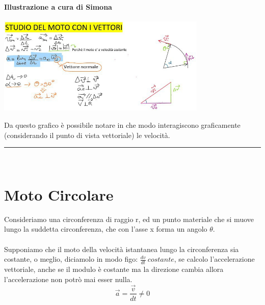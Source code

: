 \documentclass[12pt, a4paper, openany, oneside]{book}
\begin{document}
\paragraph{Illustrazione a cura di Simona}
\begin{center}
\includegraphics[width=0.75\textwidth]{mruvettoriale}
\end{center}
Da questo grafico è possibile notare in che modo interagiscono graficamente 
(considerando il punto di vista vettoriale) le velocità. 
\\
{\color{black} \rule{\linewidth}{0.3mm} }
\\
\section{Moto Circolare}
Consideriamo una circonferenza di raggio r, ed un punto materiale che si muove
lungo la suddetta circonferenza, che con l'asse x forma un angolo $\theta$. \\
\\
Supponiamo che il moto della velocità istantanea lungo la circonferenza sia 
costante, o meglio, diciamolo in modo figo: $\frac{dv}{dt} ~ costante$, se calcolo
l'accelerazione vettoriale, anche se il modulo è costante ma la direzione cambia
allora l'accelerazione non potrò mai esser nulla. 
\[\overrightarrow{a} = \frac{\overrightarrow{v}}{dt} \neq 0\]
\end{document}
